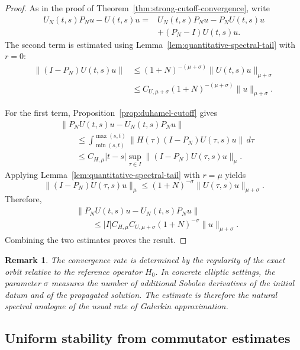 \documentclass[10pt,a4paper]{amsart}
\newtheorem{remark}[theorem]{Remark}
\begin{document}
\begin{proof}
As in the proof of Theorem~\ref{thm:strong-cutoff-convergence}, write
\[
\begin{split}
U_{N}(t,s)P_{N}u-U(t,s)u
={}&
U_{N}(t,s)P_{N}u-P_{N}U(t,s)u
\\
&+
(P_{N}-I)U(t,s)u.
\end{split}
\]
The second term is estimated using
Lemma~\ref{lem:quantitative-spectral-tail} with \(r=0\):
\[
\begin{split}
\|(I-P_{N})U(t,s)u\|
&\leq
(1+N)^{-(\mu+\sigma)}
\|U(t,s)u\|_{\mu+\sigma}
\\
&\leq
C_{U,\mu+\sigma}
(1+N)^{-(\mu+\sigma)}
\|u\|_{\mu+\sigma}.
\end{split}
\]

For the first term, Proposition~\ref{prop:duhamel-cutoff} gives
\[
\begin{split}
&\|P_{N}U(t,s)u-U_{N}(t,s)P_{N}u\|
\\
&\qquad\leq
\int_{\min(s,t)}^{\max(s,t)}
\|H(\tau)(I-P_{N})U(\tau,s)u\|\,d\tau
\\
&\qquad\leq
C_{H,\mu}|t-s|
\sup_{\tau\in I}
\|(I-P_{N})U(\tau,s)u\|_{\mu}.
\end{split}
\]
Applying Lemma~\ref{lem:quantitative-spectral-tail} with \(r=\mu\)
yields
\[
\|(I-P_{N})U(\tau,s)u\|_{\mu}
\leq
(1+N)^{-\sigma}
\|U(\tau,s)u\|_{\mu+\sigma}.
\]
Therefore,
\[
\begin{split}
&\|P_{N}U(t,s)u-U_{N}(t,s)P_{N}u\|
\\
&\qquad\leq
|I|C_{H,\mu}C_{U,\mu+\sigma}
(1+N)^{-\sigma}
\|u\|_{\mu+\sigma}.
\end{split}
\]
Combining the two estimates proves the result.
\end{proof}

\begin{remark}
\label{rem:spectral-rate-interpretation}
The convergence rate is determined by the regularity of the exact orbit
relative to the reference operator \(H_{0}\). In concrete elliptic settings,
the parameter \(\sigma\) measures the number of additional Sobolev derivatives
of the initial datum and of the propagated solution. The estimate is therefore
the natural spectral analogue of the usual rate of Galerkin approximation.
\end{remark}


\subsection{Uniform stability from commutator estimates}
\label{subsec:commutator-stability}
\end{document}
